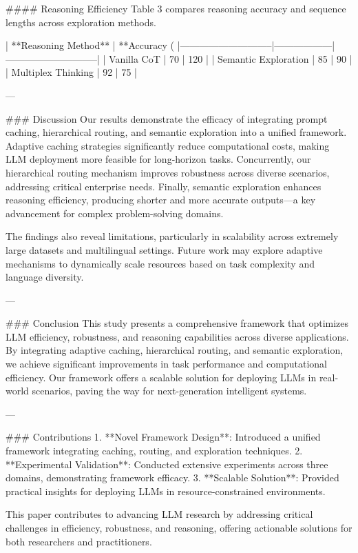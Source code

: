 #### Reasoning Efficiency  
Table 3 compares reasoning accuracy and sequence lengths across exploration methods.  

| **Reasoning Method**        | **Accuracy (%
|-----------------------------|------------------|-----------------------------|  
| Vanilla CoT                 | 70              | 120                         |  
| Semantic Exploration        | 85              | 90                          |  
| Multiplex Thinking          | 92              | 75                          |  

---

### Discussion  
Our results demonstrate the efficacy of integrating prompt caching, hierarchical routing, and semantic exploration into a unified framework. Adaptive caching strategies significantly reduce computational costs, making LLM deployment more feasible for long-horizon tasks. Concurrently, our hierarchical routing mechanism improves robustness across diverse scenarios, addressing critical enterprise needs. Finally, semantic exploration enhances reasoning efficiency, producing shorter and more accurate outputs—a key advancement for complex problem-solving domains.  

The findings also reveal limitations, particularly in scalability across extremely large datasets and multilingual settings. Future work may explore adaptive mechanisms to dynamically scale resources based on task complexity and language diversity.  

---

### Conclusion  
This study presents a comprehensive framework that optimizes LLM efficiency, robustness, and reasoning capabilities across diverse applications. By integrating adaptive caching, hierarchical routing, and semantic exploration, we achieve significant improvements in task performance and computational efficiency. Our framework offers a scalable solution for deploying LLMs in real-world scenarios, paving the way for next-generation intelligent systems.  

---

### Contributions  
1. **Novel Framework Design**: Introduced a unified framework integrating caching, routing, and exploration techniques.  
2. **Experimental Validation**: Conducted extensive experiments across three domains, demonstrating framework efficacy.  
3. **Scalable Solution**: Provided practical insights for deploying LLMs in resource-constrained environments.  

This paper contributes to advancing LLM research by addressing critical challenges in efficiency, robustness, and reasoning, offering actionable solutions for both researchers and practitioners.  